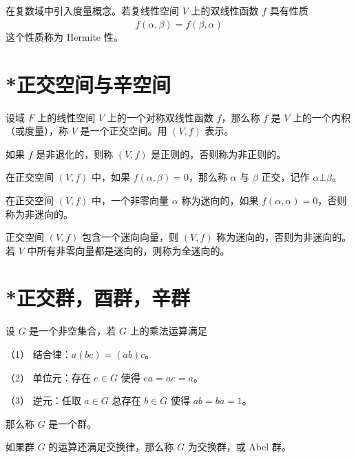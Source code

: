 在复数域中引入度量概念。若复线性空间 $V$ 上的双线性函数 $f$ 具有性质
\[ f(\alpha,\beta) = \overline{f(\beta,\alpha)} \]
这个性质称为 Hermite 性。

\section{*正交空间与辛空间}

\begin{definition}
	设域 $F$ 上的线性空间 $V$ 上的一个对称双线性函数 $f$，那么称 $f$ 是 $V$ 上的一个内积（或度量），称 $V$ 是一个正交空间。用 $(V,f)$ 表示。
\end{definition}

如果 $f$ 是非退化的，则称 $(V,f)$ 是正则的，否则称为非正则的。

\begin{definition}
	在正交空间 $(V,f)$ 中，如果 $f(\alpha,\beta) = 0$，那么称 $\alpha$ 与 $\beta$ 正交，记作 $\alpha \bot \beta$。
\end{definition}

在正交空间 $(V,f)$ 中，一个非零向量 $\alpha$ 称为迷向的，如果 $f(\alpha,\alpha) = 0$，否则称为非迷向的。

正交空间 $(V,f)$ 包含一个迷向向量，则 $(V,f)$ 称为迷向的，否则为非迷向的。若 $V$ 中所有非零向量都是迷向的，则称为全迷向的。

\section{*正交群，酉群，辛群}

\begin{definition}
	设 $G$ 是一个非空集合，若 $G$ 上的乘法运算满足
	
	（1） 结合律：$a(bc) = (ab)c$。
	
	（2） 单位元：存在 $e \in G$ 使得 $ea = ae = a$。
	
	（3） 逆元：任取 $a \in G$ 总存在 $b \in G$ 使得 $ab = ba = 1$。
	
	那么称 $G$ 是一个群。
\end{definition}

如果群 $G$ 的运算还满足交换律，那么称 $G$ 为交换群，或 Abel 群。











